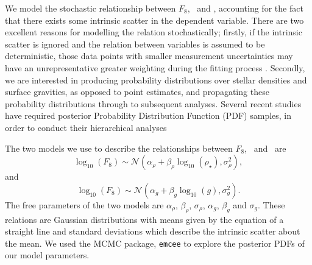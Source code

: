 We model the stochastic relationship between $F_8$, \logg\ and \rhostar,
accounting for the fact that there exists some intrinsic scatter in
the dependent variable.
There are two excellent reasons for modelling the relation stochastically;
firstly, if the intrinsic scatter is ignored and the relation between
variables is assumed to be deterministic, those data points with smaller
measurement uncertainties may have an unrepresentative greater weighting
during the fitting process \citep{Hogg2010b}.
Secondly, we are interested in producing probability distributions over
stellar densities and surface gravities, as opposed to point estimates, and
propagating these probability distributions through to subsequent analyses.
Several recent studies have required posterior Probability Distribution
Function (PDF) samples, in order to conduct their hierarchical analyses
\citep[e.g.][]{Foreman-Mackey2014, Rogers2015, Angus2015}


The two models we use to describe the relationships between $F_8$, \logg\ and
\rhostar\ are
\begin{equation}
	\log_{10}(F_8) \sim \mathcal{N} \left(\alpha_\rho +
    \beta_\rho \log_{10}(\rho_\star), \sigma_\rho^2 \right),
\end{equation}
\label{eq:rho}
and
\begin{equation}
	\log_{10}(F_8) \sim \mathcal{N} \left(\alpha_g + \beta_g
    \log_{10}(g), \sigma_g^2 \right).
\end{equation}
\label{eq:logg}
The free parameters of the two models are $\alpha_\rho$, $\beta_\rho$,
$\sigma_\rho$, $\alpha_g$, $\beta_g$ and $\sigma_g$.
These relations are Gaussian distributions with means given by the equation of
a straight line and standard deviations which describe the intrinsic scatter
about the mean.
We used the MCMC package, {\tt emcee} \citep{Foreman-Mackey2013} to explore the
posterior PDFs of our model parameters.

